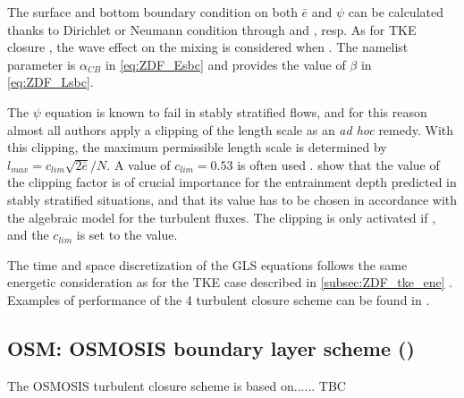 \documentclass[../tex_main/NEMO_manual]{subfiles}
\begin{document}
The surface and bottom boundary condition on both $\bar{e}$ and $\psi$ can be calculated 
thanks to Dirichlet or Neumann condition through  and , resp. 
As for TKE closure , the wave effect on the mixing is considered when 
\citep{Craig_Banner_JPO94, Mellor_Blumberg_JPO04}. The  namelist parameter 
is $\alpha_{CB}$ in \autoref{eq:ZDF_Esbc} and  provides the value of $\beta$ in \autoref{eq:ZDF_Lsbc}. 

The $\psi$ equation is known to fail in stably stratified flows, and for this reason 
almost all authors apply a clipping of the length scale as an \textit{ad hoc} remedy. 
With this clipping, the maximum permissible length scale is determined by 
$l_{max} = c_{lim} \sqrt{2\bar{e}}/ N$. A value of $c_{lim} = 0.53$ is often used 
\citep{Galperin_al_JAS88}. \cite{Umlauf_Burchard_CSR05} show that the value of 
the clipping factor is of crucial importance for the entrainment depth predicted in 
stably stratified situations, and that its value has to be chosen in accordance 
with the algebraic model for the turbulent fluxes. The clipping is only activated 
if , and the $c_{lim}$ is set to the  value.

The time and space discretization of the GLS equations follows the same energetic 
consideration as for the TKE case described in \autoref{subsec:ZDF_tke_ene}  \citep{Burchard_OM02}. 
Examples of performance of the 4 turbulent closure scheme can be found in \citet{Warner_al_OM05}.

\subsection{OSM: OSMOSIS boundary layer scheme (\protect{})}
\label{subsec:ZDF_osm}


The OSMOSIS turbulent closure scheme is based on......   TBC
\end{document}
